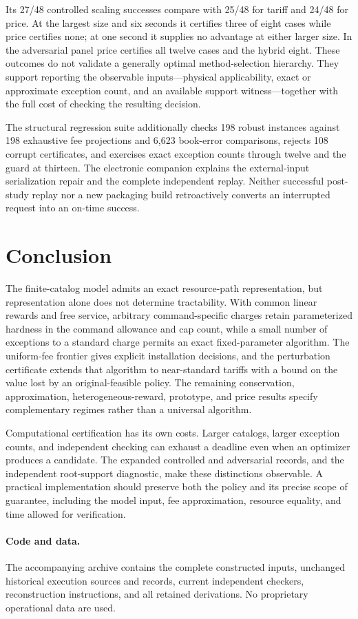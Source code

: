Its 27/48 controlled scaling successes compare with 25/48 for tariff and 24/48 for price. At the largest size and six seconds it certifies three of eight cases while price certifies none; at one second it supplies no advantage at either larger size. In the adversarial panel price certifies all twelve cases and the hybrid eight. These outcomes do not validate a generally optimal method-selection hierarchy. They support reporting the observable inputs---physical applicability, exact or approximate exception count, and an available support witness---together with the full cost of checking the resulting decision.

The structural regression suite additionally checks 198 robust instances against 198 exhaustive fee projections and 6,623 book-error comparisons, rejects 108 corrupt certificates, and exercises exact exception counts through twelve and the guard at thirteen. The electronic companion explains the external-input serialization repair and the complete independent replay. Neither successful post-study replay nor a new packaging build retroactively converts an interrupted request into an on-time success.

\section{Conclusion}\label{sec:conclusion63}
The finite-catalog model admits an exact resource-path representation, but representation alone does not determine tractability. With common linear rewards and free service, arbitrary command-specific charges retain parameterized hardness in the command allowance and cap count, while a small number of exceptions to a standard charge permits an exact fixed-parameter algorithm. The uniform-fee frontier gives explicit installation decisions, and the perturbation certificate extends that algorithm to near-standard tariffs with a bound on the value lost by an original-feasible policy. The remaining conservation, approximation, heterogeneous-reward, prototype, and price results specify complementary regimes rather than a universal algorithm.

Computational certification has its own costs. Larger catalogs, larger exception counts, and independent checking can exhaust a deadline even when an optimizer produces a candidate. The expanded controlled and adversarial records, and the independent root-support diagnostic, make these distinctions observable. A practical implementation should preserve both the policy and its precise scope of guarantee, including the model input, fee approximation, resource equality, and time allowed for verification.

\paragraph{Code and data.} The accompanying archive contains the complete constructed inputs, unchanged historical execution sources and records, current independent checkers, reconstruction instructions, and all retained derivations. No proprietary operational data are used.
